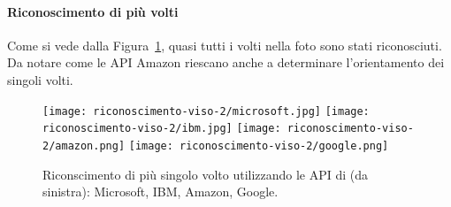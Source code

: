\paragraph{Riconoscimento di più volti}\label{par:riconscimento-volti-multipli}
Come si vede dalla Figura~\ref{fig:riconscimento-volti-multipli}, quasi tutti i volti nella foto sono stati riconosciuti.
Da notare come le API Amazon riescano anche a determinare l'orientamento dei singoli volti.
\begin{figure}[!h]
\begin{center}
	\texttt{[image: riconoscimento-viso-2/microsoft.jpg]}
	\texttt{[image: riconoscimento-viso-2/ibm.jpg]}
	\texttt{[image: riconoscimento-viso-2/amazon.png]}
	\texttt{[image: riconoscimento-viso-2/google.png]}
{\scriptsize \caption{Riconscimento di più singolo volto utilizzando le API di (da sinistra): Microsoft, IBM, Amazon, Google.}
\label{fig:riconscimento-volti-multipli}}
\end{center}
\end{figure}
%
